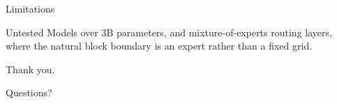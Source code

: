 \documentclass[11pt]{beamer}
\begin{document}
\begin{frame}{Limitations}
  \begin{alertblock}{Untested}
    Models over 3B parameters, and mixture-of-experts routing layers,
    where the natural block boundary is an expert rather than a fixed
    grid.
  \end{alertblock}
\end{frame}

\begin{frame}
  \centering
  \Large Thank you.
  \vspace{1em}

  \normalsize Questions?
\end{frame}
\end{document}

